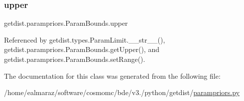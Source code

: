 \subsubsection{\texorpdfstring{upper}{upper}}
{\footnotesize\ttfamily getdist.\+parampriors.\+Param\+Bounds.\+upper}



Referenced by getdist.\+types.\+Param\+Limit.\+\_\+\+\_\+str\+\_\+\+\_\+(), getdist.\+parampriors.\+Param\+Bounds.\+get\+Upper(), and getdist.\+parampriors.\+Param\+Bounds.\+set\+Range().



The documentation for this class was generated from the following file\+:\begin{DoxyCompactItemize}
\item 
/home/ealmaraz/software/cosmomc/bde/v3./python/getdist/\mbox{\hyperlink{parampriors_8py}{parampriors.\+py}}\end{DoxyCompactItemize}

